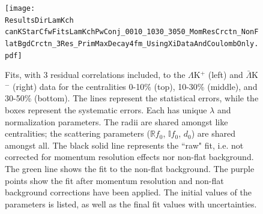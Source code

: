 \documentclass[../AnalysisNoteJBuxton.tex]{subfiles}
\begin{document}
\begin{figure}[h]
  \centering
  \texttt{[image: \\ResultsDirLamKch canKStarCfwFitsLamKchPwConj\_0010\_1030\_3050\_MomResCrctn\_NonFlatBgdCrctn\_3Res\_PrimMaxDecay4fm\_UsingXiDataAndCoulombOnly.pdf]}
  \caption[$\Lambda$K$^{+}$($\bar{\Lambda}$K$^{-}$) Fits with 3 Residuals]{Fits, with 3 residual correlations included, to the $\Lambda$K$^{+}$ (left) and $\bar{\Lambda}$K$^{-}$ (right) data for the centralities 0-10\% (top), 10-30\% (middle), and 30-50\% (bottom).
The lines represent the statistical errors, while the boxes represent the systematic errors.  
Each has unique $\lambda$ and normalization parameters.
The radii are shared amongst like centralities; the scattering parameters ($\mathbb{R}f_{0}$, $\mathbb{I}f_{0}$, $d_{0}$) are shared amongst all.
The black solid line represents the ``raw" fit, i.e. not corrected for momentum resolution effects nor non-flat background.  
The green line shows the fit to the non-flat background.
The purple points show the fit after momentum resolution and non-flat background corrections have been applied.
The initial values of the parameters is listed, as well as the final fit values with uncertainties.}
  \label{fig:LamKchPwConjFits_3Res}
\end{figure}

\end{document}
